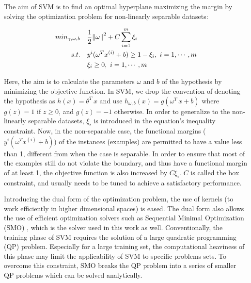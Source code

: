 The aim of SVM is to find an optimal hyperplane maximizing the margin by solving the optimization problem for non-linearly separable datasets:

\begin{align}
min_{\gamma,\omega,b} \quad & \frac{1}{2} \norm{\omega}^2 + C \sum\limits_{i = 1}^m \xi_i \\
s.t. \quad & y^{i}(\omega^T x^{(i)} + b) \geq 1 - \xi_i, \ i = 1, \cdots, m\\
 & \xi_i \geq 0, \ i = 1, \cdots, m
\end{align}

Here, the aim is to calculate the parameters $\omega$ and $b$ of the hypothesis by minimizing the objective function. In SVM, we drop the convention of denoting the hypothesis as $h(x)= \theta^T \, x$ and use $h_{\omega,b}(x)=g(\omega^T \, x + b)$ where $g(z) = 1$ if $z\geq0$, and $g(z)=-1$ otherwise. In order to generalize to the non-linearly separable datasets, $\xi_i$ is introduced in the equation's inequality constraint. Now, in the non-separable case, the functional margins ($y^{i}(\omega^T x^{(i)} + b)$) of the instances (examples) are permitted to have a value less than 1, different from when the case is separable. In order to ensure that most of the examples still do not violate the boundary, and thus have a functional margin of at least 1, the objective function is also increased by $C \xi_i$. $C$ is called the box constraint, and usually needs to be tuned to achieve a satisfactory performance.

Introducing the dual form of the optimization problem, the use of kernels (to work efficiently in higher dimensional spaces) is eased.
The dual form also allows the use of efficient optimization solvers such as Sequential Minimal Optimization (SMO)  \cite{platt1998sequential}, which is the solver used in this work as well. Conventionally, the training phase of SVM requires the solution of a large quadratic programming (QP) problem. Especially for a large training set, the computational heaviness of this phase may limit the applicability of SVM to specific problems sets. To overcome this constraint, SMO breaks the QP problem into a series of smaller QP problems which can be solved analytically. 


